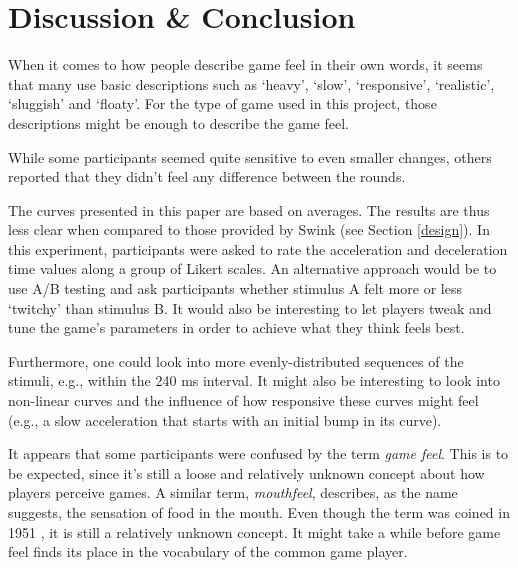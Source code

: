 \section{Discussion \& Conclusion} \label{discussion}
When it comes to how people describe game feel in their own words, it seems that many use basic descriptions such as `heavy', `slow', `responsive', `realistic', `sluggish' and `floaty'. For the type of game used in this project, those descriptions might be enough to describe the game feel.


While some participants seemed quite sensitive to even smaller changes, others reported that they didn't feel any difference between the rounds.

The curves presented in this paper are based on averages. The results are thus less clear when compared to those provided by Swink (see Section \ref{design}). In this experiment, participants were asked to rate the acceleration and deceleration time values along a group of Likert scales. An alternative approach would be to use A/B testing and ask participants whether stimulus A felt more or less `twitchy' than stimulus B. It would also be interesting to let players tweak and tune the game's parameters in order to achieve what they think feels best.

Furthermore, one could look into more evenly-distributed sequences of the stimuli, e.g., within the 240 ms interval. It might also be interesting to look into non-linear curves and the influence of how responsive these curves might feel (e.g., a slow acceleration that starts with an initial bump in its curve).

It appears that some participants were confused by the term \textit{game feel}. This is to be expected, since it's still a loose and relatively unknown concept about how players perceive games. A similar term, \textit{mouthfeel}, describes, as the name suggests, the sensation of food in the mouth. Even though the term was coined in 1951 \cite{mouthfeel}, it is still a relatively unknown concept. It might take a while before game feel finds its place in the vocabulary of the common game player.

